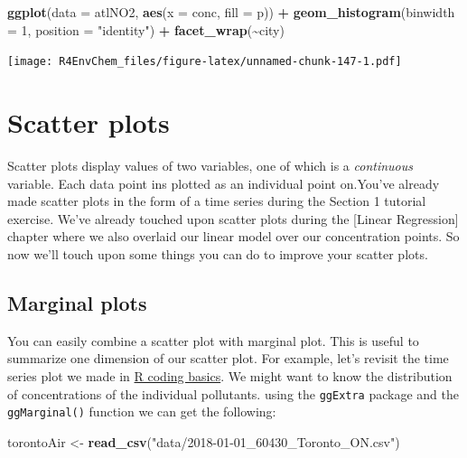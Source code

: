 \documentclass[
]{book}
\newenvironment{Shaded}{\begin{snugshade}}{\end{snugshade}}
\newcommand{\AttributeTok}[1]{\textcolor[rgb]{0.13,0.29,0.53}{#1}}
\newcommand{\DecValTok}[1]{\textcolor[rgb]{0.00,0.00,0.81}{#1}}
\newcommand{\FunctionTok}[1]{\textcolor[rgb]{0.13,0.29,0.53}{\textbf{#1}}}
\newcommand{\NormalTok}[1]{#1}
\newcommand{\OtherTok}[1]{\textcolor[rgb]{0.56,0.35,0.01}{#1}}
\newcommand{\SpecialCharTok}[1]{\textcolor[rgb]{0.81,0.36,0.00}{\textbf{#1}}}
\newcommand{\StringTok}[1]{\textcolor[rgb]{0.31,0.60,0.02}{#1}}
\begin{document}
\begin{Shaded}
\begin{Highlighting}[]
\FunctionTok{ggplot}\NormalTok{(}\AttributeTok{data =}\NormalTok{ atlNO2, }
       \FunctionTok{aes}\NormalTok{(}\AttributeTok{x =}\NormalTok{ conc, }\AttributeTok{fill =}\NormalTok{ p)) }\SpecialCharTok{+} 
  \FunctionTok{geom\_histogram}\NormalTok{(}\AttributeTok{binwidth =} \DecValTok{1}\NormalTok{, }\AttributeTok{position =} \StringTok{"identity"}\NormalTok{) }\SpecialCharTok{+}
  \FunctionTok{facet\_wrap}\NormalTok{(}\SpecialCharTok{\textasciitilde{}}\NormalTok{city)}
\end{Highlighting}
\end{Shaded}

\texttt{[image: R4EnvChem\_files/figure-latex/unnamed-chunk-147-1.pdf]}

\hypertarget{scatter-plots}{%
\section{Scatter plots}\label{scatter-plots}}

Scatter plots display values of two variables, one of which is a \emph{continuous} variable. Each data point ins plotted as an individual point on.You've already made scatter plots in the form of a time series during the Section 1 tutorial exercise. We've already touched upon scatter plots during the {[}Linear Regression{]} chapter where we also overlaid our linear model over our concentration points. So now we'll touch upon some things you can do to improve your scatter plots.

\hypertarget{marginal-plots}{%
\subsection{Marginal plots}\label{marginal-plots}}

You can easily combine a scatter plot with marginal plot. This is useful to summarize one dimension of our scatter plot. For example, let's revisit the time series plot we made in \protect\hyperlink{r-coding-basics}{R coding basics}. We might want to know the distribution of concentrations of the individual pollutants. using the \texttt{ggExtra} package and the \texttt{ggMarginal()} function we can get the following:

\begin{Shaded}
\begin{Highlighting}[]
\NormalTok{torontoAir }\OtherTok{\textless{}{-}} \FunctionTok{read\_csv}\NormalTok{(}\StringTok{"data/2018{-}01{-}01\_60430\_Toronto\_ON.csv"}\NormalTok{)}
\end{Highlighting}
\end{Shaded}
\end{document}
